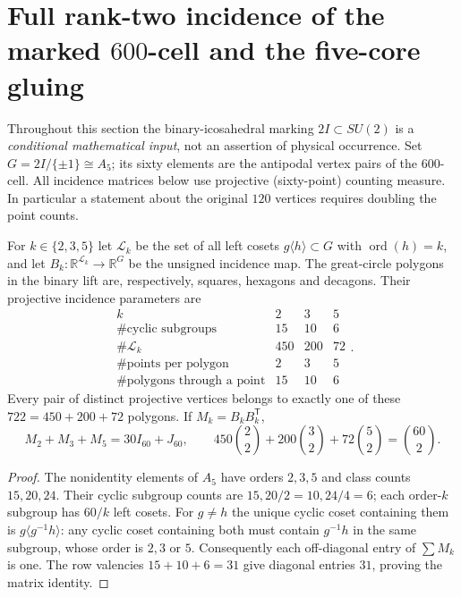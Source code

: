 \documentclass[11pt]{article}
\begin{document}
\section{Full rank-two incidence of the marked $600$-cell and the five-core gluing}
\label{p1:sec:v340-ranktwo-incidence}
Throughout this section the binary-icosahedral marking $2I\subset SU(2)$
is a \emph{conditional mathematical input}, not an assertion of physical
occurrence. Set $G=2I/\{\pm1\}\cong A_5$; its sixty elements are the
antipodal vertex pairs of the $600$-cell. All incidence matrices below
use projective (sixty-point) counting measure. In particular a statement
about the original $120$ vertices requires doubling the point counts.

\begin{theorem}
\label{p1:thm:v340-cyclic-coset-design}
For $k\in\{2,3,5\}$ let $\mathscr L_k$ be the set of all left cosets
$g\langle h\rangle\subset G$ with $\operatorname{ord}(h)=k$, and let
$B_k:\mathbb R^{\mathscr L_k}\to\mathbb R^G$ be the unsigned incidence
map. The great-circle polygons in the binary lift are, respectively,
squares, hexagons and decagons. Their projective incidence parameters are
\[
\begin{array}{c|ccc}
 k&2&3&5\\\hline
 \#\text{cyclic subgroups}&15&10&6\\
 \#\mathscr L_k&450&200&72\\
 \#\text{points per polygon}&2&3&5\\
 \#\text{polygons through a point}&15&10&6
\end{array}.
\]
Every pair of distinct projective vertices belongs to exactly one of
these $722=450+200+72$ polygons. If $M_k=B_kB_k^{\mathsf T}$,
\[
\boxed{M_2+M_3+M_5=30I_{60}+J_{60}},\qquad
450\binom22+200\binom32+72\binom52=\binom{60}{2}.
\]
\end{theorem}
\begin{proof}
The nonidentity elements of $A_5$ have orders $2,3,5$ and class counts
$15,20,24$. Their cyclic subgroup counts are $15,20/2=10,24/4=6$;
each order-$k$ subgroup has $60/k$ left cosets. For $g\ne h$ the
unique cyclic coset containing them is $g\langle g^{-1}h\rangle$:
any cyclic coset containing both must contain $g^{-1}h$ in the same
subgroup, whose order is $2,3$ or $5$. Consequently each off-diagonal
entry of $\sum M_k$ is one. The row valencies $15+10+6=31$ give
diagonal entries $31$, proving the matrix identity.
\end{proof}
\end{document}
